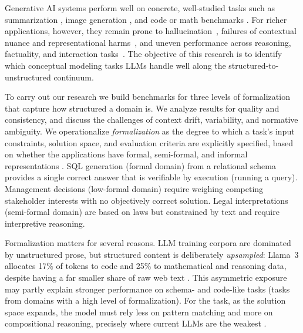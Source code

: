 \documentclass[runningheads]{llncs}
\begin{document}
Generative AI systems perform well on concrete, well-studied tasks such as summarization 
\cite{DBLP:conf/acl/LewisLGGMLSZ20},
image generation \cite{rombach2022high},
and code or math benchmarks
\cite{li2022alphacode,DBLP:conf/nips/LewkowyczADDMRS22}.
For richer applications, however, they remain prone to hallucination~\cite{huang2025survey,ji2023survey}, failures of contextual nuance and representational harms~\cite{bender2021dangers}, and uneven performance across reasoning, factuality, and interaction tasks~\cite{bang2023multitask}. The objective of this research is to identify which conceptual modeling tasks LLMs handle well along the structured-to-unstructured continuum.

To carry out our research we build benchmarks for three levels of formalization that capture how structured a domain is. We analyze results for quality and consistency, and discuss the challenges of context drift, variability, and normative ambiguity. We operationalize \emph{formalization} as the degree to which a task's input constraints, solution space, and evaluation criteria are explicitly specified,
based on whether the applications have
formal, semi-formal, and informal representations \cite{mylopoulos1992conceptual,olive2007conceptual,DBLP:journals/isj/WandW93}. SQL generation (formal domain) from a relational schema provides a single correct answer that is verifiable by execution (running a query). Management decisions (low-formal domain) require weighing competing stakeholder interests with no objectively correct solution. Legal interpretations (semi-formal domain) are based on laws but constrained by text and require interpretive reasoning.


Formalization matters for several reasons. 
LLM training corpora are dominated by unstructured prose, but structured content is deliberately \emph{upsampled}: Llama~3 allocates 17\% of tokens to code and 25\% to mathematical and reasoning data, despite having a far smaller share of raw web text \cite{grattafiori2024llama3herdmodels}.
This asymmetric exposure may partly explain stronger performance on schema- and code-like tasks (tasks from domains with a high level of formalization).
For the task, as the solution space expands, the model must rely less on pattern matching and more on compositional reasoning, precisely where current LLMs are the weakest \cite{dziri2023faith}.
\end{document}
